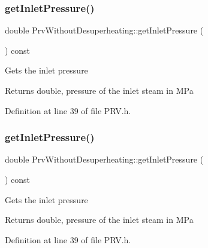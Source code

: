 \subsubsection{\texorpdfstring{get\+Inlet\+Pressure()}{getInletPressure()}\hspace{0.1cm}{\footnotesize\ttfamily [1/3]}}
{\footnotesize\ttfamily double Prv\+Without\+Desuperheating\+::get\+Inlet\+Pressure (\begin{DoxyParamCaption}{ }\end{DoxyParamCaption}) const\hspace{0.3cm}{\ttfamily [inline]}}

Gets the inlet pressure

\begin{DoxyReturn}{Returns}
double, pressure of the inlet steam in M\+Pa 
\end{DoxyReturn}


Definition at line 39 of file P\+R\+V.\+h.

\mbox{\label{class_prv_without_desuperheating_a4b1244b479abfaef01abbb62395dff13}} 
\subsubsection{\texorpdfstring{get\+Inlet\+Pressure()}{getInletPressure()}\hspace{0.1cm}{\footnotesize\ttfamily [2/3]}}
{\footnotesize\ttfamily double Prv\+Without\+Desuperheating\+::get\+Inlet\+Pressure (\begin{DoxyParamCaption}{ }\end{DoxyParamCaption}) const\hspace{0.3cm}{\ttfamily [inline]}}

Gets the inlet pressure

\begin{DoxyReturn}{Returns}
double, pressure of the inlet steam in M\+Pa 
\end{DoxyReturn}


Definition at line 39 of file P\+R\+V.\+h.

\mbox{\label{class_prv_without_desuperheating_a4b1244b479abfaef01abbb62395dff13}} 
